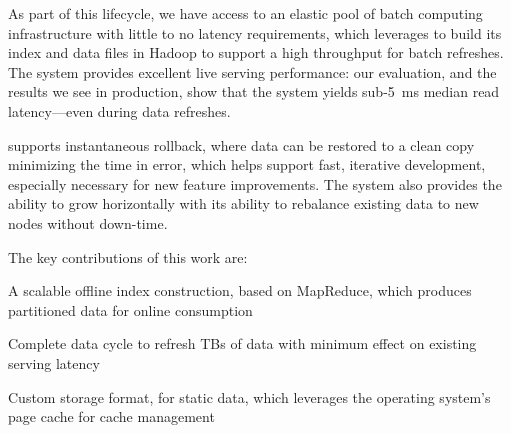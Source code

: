 As part of this lifecycle, we have access to an elastic pool of batch
computing infrastructure with little to no latency requirements, which
\projectname{} leverages to build its index and data files in Hadoop
to support a high throughput for batch refreshes. The system provides
excellent live serving performance: our evaluation, and the results we
see in production, show that the system yields sub-5~ms median read
latency---even during data refreshes. 

\projectname{} supports instantaneous rollback, where data can be
restored to a clean copy minimizing the time in error, which helps
support fast, iterative development, especially necessary for new
feature improvements. The system also provides the ability to grow
horizontally with its ability to rebalance existing data to new nodes
without down-time. 

The key contributions of this work are:
\begin{compactitem}
\item A scalable offline index construction, based on 
MapReduce, which produces partitioned data for online consumption
\item Complete data cycle to refresh TBs of data with minimum effect on
existing serving latency
\item Custom storage format, for static data, which leverages the 
operating system's page cache for cache management
\end{compactitem}

